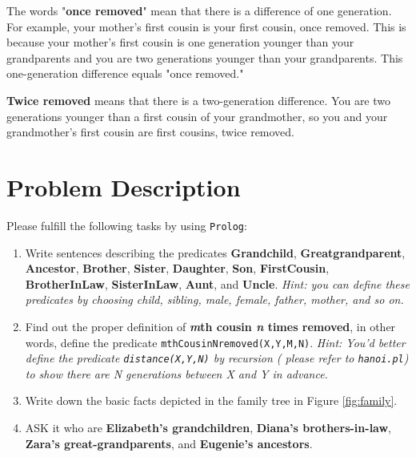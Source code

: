 ﻿\documentclass[a4paper, 11pt]{article}
\begin{document}
The words "\textbf{once removed}" mean that there is a difference of one generation. For example, your mother's first cousin is your first cousin, once removed. This is because your mother's first cousin is one generation younger than your grandparents and you are two generations younger than your grandparents. This one-generation difference equals "once removed."

\textbf{Twice removed} means that there is a two-generation difference. You are two generations younger than a first cousin of your grandmother, so you and your grandmother's first cousin are first cousins, twice removed.
\section{Problem Description}
Please fulfill the following tasks by using \texttt{Prolog}:
\begin{enumerate}
\item Write sentences describing the predicates \textbf{Grandchild}, \textbf{Greatgrandparent}, \textbf{Ancestor}, \textbf{Brother}, \textbf{Sister}, \textbf{Daughter}, \textbf{Son}, \textbf{FirstCousin}, \textbf{BrotherInLaw}, \textbf{SisterInLaw}, \textbf{Aunt}, and \textbf{Uncle}. \emph{Hint: you can define these predicates by choosing child, sibling, male, female, father, mother, and so on. }
\item Find out the proper definition of \textbf{\emph{m}th cousin \emph{n} times removed}, in other words, define the predicate \texttt{mthCousinNremoved(X,Y,M,N)}. \emph{Hint: You'd better define the predicate \texttt{distance(X,Y,N)} by recursion ( please refer to \texttt{hanoi.pl}) to show there are N generations between X and Y in advance.}

\item Write down the basic facts depicted in the family tree in Figure \ref{fig:family}.

\item ASK it who are \textbf{Elizabeth's grandchildren}, \textbf{Diana's brothers-in-law}, \textbf{Zara's great-grandparents}, and \textbf{Eugenie's ancestors}.
\end{enumerate}
\end{document}
